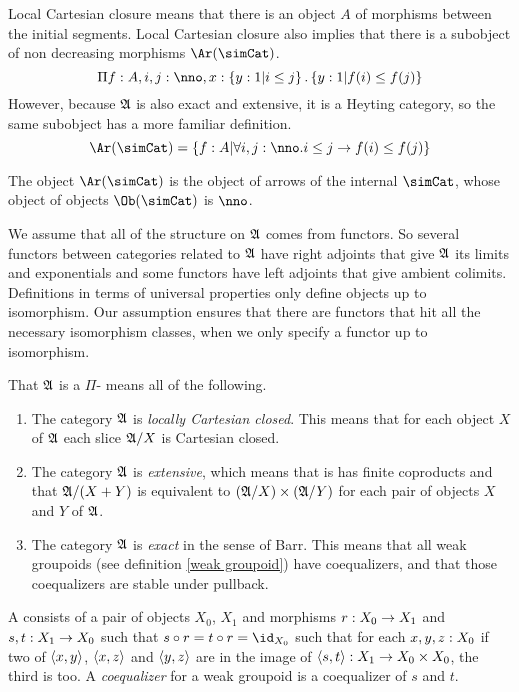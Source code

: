 \documentclass[csh.tex]{subfiles}
\begin{document}
Local Cartesian closure means that there is an object $A$ of morphisms between the initial segments. Local Cartesian closure also implies that there is a subobject of non decreasing morphisms $\Ar(\simCat)$.
\[ \product{f\of A,i,j\of\nno,x\of\set{y\of 1|i\leq j}}{\set{y\of 1|f(i)\leq f(j)}}\]
However, because $\mathfrak A$ is also exact and extensive, it is a Heyting category, so the same subobject has a more familiar definition.
\[ \Ar(\simCat)=\set{f\of A|\forall i,j\of\nno.i\leq j \to f(i)\leq f(j)} \]

\begin{definition} The object $\Ar(\simCat)$ is the object of arrows of the internal  $\simCat$, whose object of objects $\Ob(\simCat)$ is $\nno$.
\end{definition}

\begin{remark} We assume that all of the structure on $\mathfrak A$ comes from functors. So several functors between categories related to $\mathfrak A$ have right adjoints that give $\mathfrak A$ its limits and exponentials and some functors have left adjoints that give ambient colimits. Definitions in terms of universal properties only define objects up to isomorphism. Our assumption ensures that there are functors that hit all the necessary isomorphism classes, when we only specify a functor up to isomorphism.
\end{remark}

\begin{definition} 
That $\mathfrak A$ is a $\Pi$- means all of the following.

\begin{enumerate}
\item The category $\mathfrak A$ is \emph{locally Cartesian closed}. This means that for each object $X$ of $\mathfrak A$ each slice $\mathfrak A/X$ is Cartesian closed.
\item The category $\mathfrak A$ is \emph{extensive}, which means that is has finite coproducts and that $\mathfrak A/(X+Y)$ is equivalent to $(\mathfrak A/X)\times(\mathfrak A/Y)$ for each pair of objects $X$ and $Y$ of $\mathfrak A$.
\item The category $\mathfrak A$ is \emph{exact} in the sense of Barr. This means that all weak groupoids (see definition \ref{weak groupoid}) have coequalizers, and that those coequalizers are stable under pullback.
\end{enumerate}

A  consists of a pair of objects $X_0$, $X_1$ and morphisms $r: X_0\to X_1$ and $s,t: X_1\to X_0$ such that $s\circ r= t\circ r = \id_{X_0}$ such that for each $x,y,z: X_0$ if two of $\left\langle x,y \right\rangle$, $\left\langle x,z \right\rangle$ and $\left\langle y,z \right\rangle$ are in the image of $\left\langle s,t \right\rangle: X_1\to X_0\times X_0$, the third is too. A \emph{coequalizer} for a weak groupoid is a coequalizer of $s$ and $t$.
\end{definition}
\end{document}
